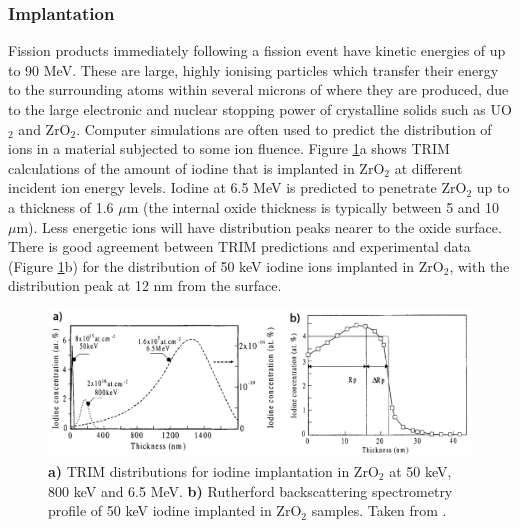 \subsubsection{Implantation} \label{implantation}

Fission products immediately following a fission event have kinetic energies of up to 90 MeV. These are large, highly ionising particles which transfer their energy to the surrounding atoms within several microns of where they are produced, due to the large electronic and nuclear stopping power of crystalline solids such as UO$_{2}$ and ZrO$_{2}$. Computer simulations are often used to predict the distribution of ions in a material subjected to some ion fluence. Figure \ref{figure:srimtrim}a shows TRIM calculations of the amount of iodine that is implanted in ZrO$_{2}$ at different incident ion energy levels. Iodine at 6.5 MeV is predicted to penetrate ZrO$_{2}$ up to a thickness of 1.6 $\mu$m (the internal oxide thickness is typically between 5 and 10 $\mu$m). Less energetic ions will have distribution peaks nearer to the oxide surface. There is good agreement between TRIM predictions and experimental data (Figure \ref{figure:srimtrim}b) for the distribution of 50 keV iodine ions implanted in ZrO$_{2}$, with the distribution peak at 12 nm from the surface.

\begin{figure}[ht] %
\centering
\includegraphics[width=\linewidth]{images/srimtrim.png}
\caption[\textbf{a)} TRIM distributions for iodine implantation in ZrO$_{2}$ at 50 keV, 800 keV and 6.5 MeV. \textbf{b)} Rutherford backscattering spectrometry profile of 50 keV iodine implanted in ZrO$_{2}$ samples.]{\textbf{a)} TRIM distributions for iodine implantation in ZrO$_{2}$ at 50 keV, 800 keV and 6.5 MeV. \textbf{b)} Rutherford backscattering spectrometry profile of 50 keV iodine implanted in ZrO$_{2}$ samples. Taken from \cite{brossard1998use}.}
\label{figure:srimtrim}
\end{figure}


